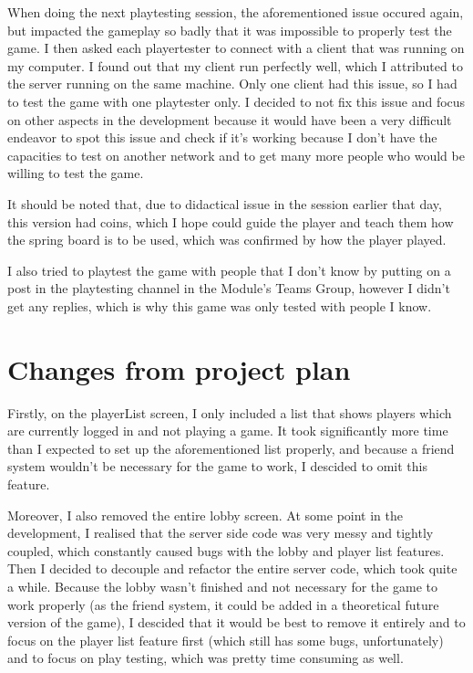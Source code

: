 \documentclass{article}
\begin{document}
\bigskip
When doing the next playtesting session, the aforementioned issue occured again, but impacted the gameplay so badly that it was impossible to properly test the game. I then asked each playertester to connect with a client that was running on my computer. I found out that my client run perfectly well, which I attributed to the server running on the same machine. Only one client had this issue, so I had to test the game with one playtester only. I decided to not fix this issue and focus on other aspects in the development because it would have been a very difficult endeavor to spot this issue and check if it's working because I don't have the capacities to test on another network and to get many more people who would be willing to test the game.

It should be noted that, due to didactical issue in the session earlier that day, this version had coins, which I hope could guide the player and teach them how the spring board is to be used, which was confirmed by how the player played.

\bigskip
I also tried to playtest the game with people that I don't know by putting on a post in the playtesting channel in the Module's Teams Group, however I didn't get any replies, which is why this game was only tested with people I know.


\section{Changes from project plan}
Firstly, on the playerList screen, I only included a list that shows players which are currently logged in and not playing a game. It took significantly more time than I expected to set up the aforementioned list properly, and because a friend system wouldn't be necessary for the game to work, I descided to omit this feature. 

\bigskip
Moreover, I also removed the entire lobby screen. At some point in the development, I realised that the server side code was very messy and tightly coupled, which constantly caused bugs with the lobby and player list features. Then I decided to decouple and refactor the entire server code, which took quite a while. Because the lobby wasn't finished and not necessary for the game to work properly (as the friend system, it could be added in a theoretical future version of the game), I descided that it would be best to remove it entirely and to focus on the player list feature first (which still has some bugs, unfortunately) and to focus on play testing, which was pretty time consuming as well.
\end{document}
